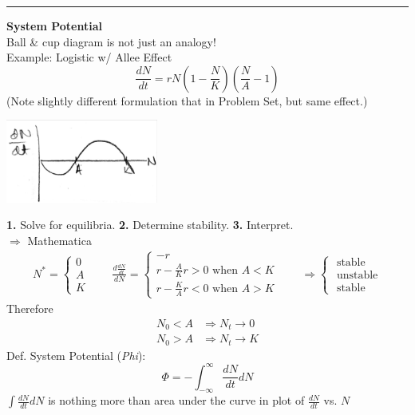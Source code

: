 \documentclass{article}
\newcommand{\note}[1]{\colorbox{gray!30}{#1}}
\newcommand{\ind}{\-\hspace{1cm}}
\begin{document}
\rule[0.5ex]{\linewidth}{1pt}
\textbf{System Potential}\\
Ball \& cup diagram is not just an analogy!\\

Example: Logistic w/ Allee Effect\\
\begin{equation*}
	\frac{dN}{dt}=rN\left(1-\frac{N}{K}\right)\left(\frac{N}{A}-1\right)
\end{equation*}
\ind (Note slightly different formulation that in Problem Set, but same effect.)
\begin{center}
 	\includegraphics[width=5cm]{figs/LogisticAllee.pdf}
\end{center}
\pagebreak
\textbf{1.} Solve for equilibria. \ind \textbf{2.} Determine stability. \ind \textbf{3.} Interpret.\\
\note{$\Rightarrow$ Mathematica}
\begin{align*}
N^*=\begin{cases}
	0\\
	A\\
	K
\end{cases}\qquad
\frac{d\tfrac{dN}{dt}}{dN}=\begin{cases}
	-r\\
	r-\frac{A}{K}r>0 \text{ when }A<K \\
	r-\frac{K}{A}r<0 \text{ when }A>K 
\end{cases}\qquad
\Rightarrow\begin{cases}
	\text{ stable}\\
	\text{ unstable}\\
	\text{ stable}
\end{cases}
\end{align*}
Therefore
\begin{align*}
	N_0<A &\Rightarrow N_t \to 0\\
	N_0>A &\Rightarrow N_t \to K
\end{align*}
Def. System Potential (\emph{Phi}):
\begin{equation*}
	\boxed{\Phi=-\int_{-\infty}^{\infty}\frac{dN}{dt} dN}
\end{equation*}
$\int \frac{dN}{dt} dN$ is nothing more than area under the curve in plot of $\frac{dN}{dt}$ vs. $N$
\end{document}
